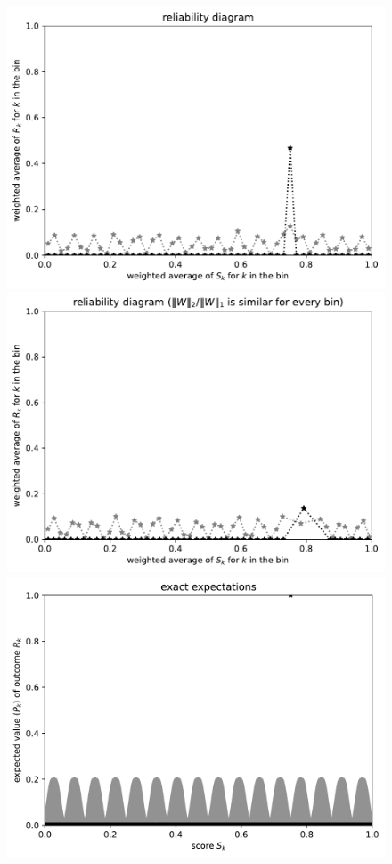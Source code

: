 \documentclass{article}
\begin{document}
\begin{figure}
\begin{centering}
\parbox{\imsize}{\includegraphics[width=\imsize]
                 {./codes/weighted/50000_2500_50_3/equiscores.pdf}}
\quad\quad
\parbox{\imsize}{\includegraphics[width=\imsize]
                 {./codes/weighted/50000_2500_50_3/equierrs.pdf}}

\vspace{\vertsep}

\parbox{\imsize}{\includegraphics[width=\imsize]
                 {./codes/weighted/50000_2500_10_3/exact.jpg}}


\end{centering}
\end{figure}
\end{document}
